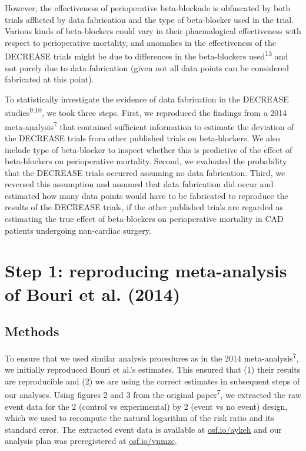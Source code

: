 \documentclass[]{article}
\begin{document}
However, the effectiveness of perioperative beta-blockade is obfuscated
by both trials afflicted by data fabrication and the type of
beta-blocker used in the trial. Various kinds of beta-blockers could
vary in their pharmalogical effectiveness with respect to perioperative
mortality, and anomalies in the effectiveness of the DECREASE trials
might be due to differences in the beta-blockers
used\textsuperscript{13} and not purely due to data fabrication (given
not all data points can be considered fabricated at this point).

To statistically investigate the evidence of data fabrication in the
DECREASE studies\textsuperscript{9,10}, we took three steps. First, we
reproduced the findings from a 2014 meta-analysis\textsuperscript{7}
that contained sufficient information to estimate the deviation of the
DECREASE trials from other published trials on beta-blockers. We also
include type of beta-blocker to inspect whether this is predictive of
the effect of beta-blockers on perioperative mortality. Second, we
evaluated the probability that the DECREASE trials occurred assuming no
data fabrication. Third, we reversed this assumption and assumed that
data fabrication did occur and estimated how many data points would have
to be fabricated to reproduce the results of the DECREASE trials, if the
other published trials are regarded as estimating the true effect of
beta-blockers on perioperative mortality in CAD patients undergoing
non-cardiac surgery.

\section{Step 1: reproducing meta-analysis of Bouri et al.
(2014)}\label{step-1-reproducing-meta-analysis-of-bouri-et-al.-2014}

\subsection{Methods}\label{methods}

To ensure that we used similar analysis procedures as in the 2014
meta-analysis\textsuperscript{7}, we initially reproduced Bouri et al.'s
estimates. This ensured that (1) their results are reproducible and (2)
we are using the correct estimates in subsequent steps of our analyses.
Using figures 2 and 3 from the original paper\textsuperscript{7}, we
extracted the raw event data for the 2 (control vs experimental) by 2
(event vs no event) design, which we used to recompute the natural
logarithm of the risk ratio and its standard error. The extracted event
data is available at \href{https://osf.io/aykeh}{osf.io/aykeh} and our
analysis plan was preregistered at
\href{https://osf.io/vnmzc}{osf.io/vnmzc}.
\end{document}
